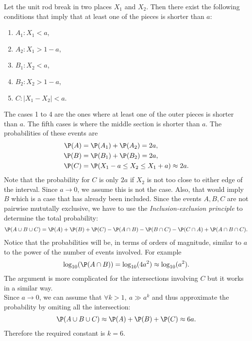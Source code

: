 \documentclass{article}
\begin{document}
Let the unit rod break in two places $X_1$ and $X_2$. Then there
exist the following conditions that imply that at least one of the pieces is shorter
than $a$:
\begin{enumerate}
  \item $A_1:X_1<a$,
  \item $A_2:X_1>1-a$,
  \item $B_1:X_2<a$,
  \item $B_2:X_2>1-a$,
  \item $C:|X_1-X_2|<a$.
\end{enumerate}
The cases 1 to 4 are the ones where at least one of the outer
pieces is shorter than $a$. The fifth cases is where the middle section 
is shorter than $a$. The probabilities of these events are
\begin{align*}
  \P(A) &= \P(A_1) + \P(A_2) = 2a,\\
  \P(B) &= \P(B_1) + \P(B_2) = 2a,\\
  \P(C) &= \P(X_1-a\leq X_2 \leq X_1+a) \approx 2a.
\end{align*}
Note that the probability for $C$ is only $2a$ if $X_2$ is not too close to
either edge of the interval. Since $a\to 0$, we assume this is not the case.
Also, that would imply $B$ which is a case that has already been included.
Since the events $A,B,C$ are not pairwise mututally exclusive,
we have to use the \emph{Inclusion-exclusion principle}
to determine the total probability:
\begin{align*}
  \P(A\cup B\cup C) = \P(A) + \P(B) + \P(C) - \P(A \cap B) - \P(B\cap C) - \P(C\cap A) + \P(A\cap B\cap C).
\end{align*}
Notice that the probabilities will be, in terms of orders of magnitude,
similar to $a$ to the power of the number of events involved. For example
\begin{align*}
    \log_{10}(\P(A\cap B)) = \log_{10}(4a^2) \approx \log_{10}(a^2).
\end{align*}
The argument is more complicated for the intersections involving $C$ but
it works in a similar way.\\
Since $a\to 0$, we can assume that $\forall k>1,\:a\gg a^k$ and thus
approximate the probability by omiting all the intersection:
\begin{align*}
  \P(A\cup B\cup C) \approx \P(A) + \P(B) + \P(C) \approx 6a.
\end{align*}
Therefore the required constant is $k=6$.
\end{document}

